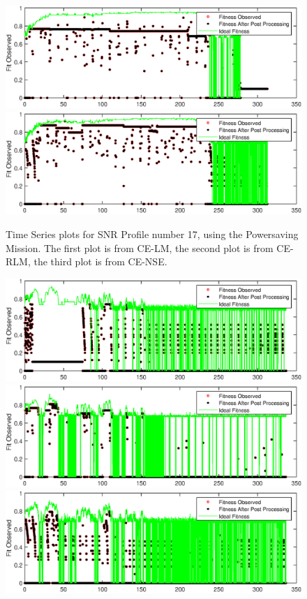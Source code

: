 \begin{appendices}
\begin{figure}[ht!]
\includegraphics{figures/c_sim_timeSeries/Fitness_timeSeries_RLM_17.eps}
\includegraphics{figures/c_sim_timeSeries/Fitness_timeSeries_NSE_17.eps}
\caption{Time Series plots for SNR Profile number 17, using the Powersaving Mission. The first plot is from CE-LM, the second plot is from CE-RLM, the third plot is from CE-NSE.}
\end{figure}
\begin{figure}[ht!]
\includegraphics{figures/c_sim_timeSeries/Fitness_timeSeries_LM_18.eps}
\includegraphics{figures/c_sim_timeSeries/Fitness_timeSeries_RLM_18.eps}
\includegraphics{figures/c_sim_timeSeries/Fitness_timeSeries_NSE_18.eps}

\end{figure}
\end{appendices}
